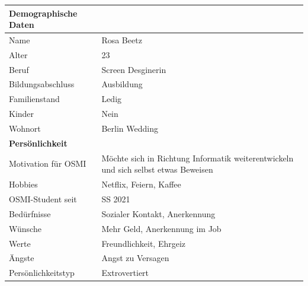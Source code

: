 \documentclass{article}
\begin{document}
\begin{center}
	\begin{tabularx}{\textwidth}{|l|X|}
		\hline
		\textbf{Demographische Daten} &                                                     \\
		\hline
		Name                          & Rosa Beetz                                          \\
		\hline
		Alter                         & 23                                                  \\
		\hline
		Beruf                         & Screen Desginerin                                   \\
		\hline
		Bildungsabschluss             & Ausbildung                                          \\
		\hline
		Familienstand                 & Ledig                                               \\
		\hline
		Kinder                        & Nein                                                \\
		\hline
		Wohnort                       & Berlin Wedding                                      \\
		\hline
		\textbf{Persönlichkeit}       &                                                     \\
		\hline
		Motivation für OSMI           & Möchte sich in Richtung Informatik weiterentwickeln
		und sich selbst etwas Beweisen                                                      \\
		\hline
		Hobbies                       & Netflix, Feiern, Kaffee                             \\
		\hline
		OSMI-Student seit             & SS 2021                                             \\
		\hline
		Bedürfnisse                   & Sozialer Kontakt, Anerkennung                       \\
		\hline
		Wünsche                       & Mehr Geld, Anerkennung im Job                       \\
		\hline
		Werte                         & Freundlichkeit, Ehrgeiz                             \\
		\hline
		Ängste                        & Angst zu Versagen                                   \\
		\hline
		Persönlichkeitstyp            & Extrovertiert                                       \\
		\hline
	\end{tabularx}
\end{center}
\end{document}
